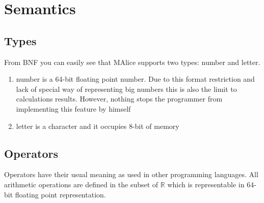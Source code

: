 \documentclass[a4wide, 11pt]{article}
\begin{document}
\section{Semantics}

\subsection{Types}

From BNF you can easily see that MAlice supports two types: number and letter.

\begin{enumerate}
     \item
     number is a 64-bit floating point number. Due to this format restriction and lack of special way of representing big numbers this is also the limit to calculations results. However, nothing stops the programmer from implementing this feature by himself

     \item
     letter is a character and it occupies 8-bit of memory

\end{enumerate}

\subsection{Operators}

Operators have their usual meaning as used in other programming languages. All arithmetic operations are defined in the subset of $\mathbb{R}$ which is representable in 64-bit floating point representation.
\end{document}
